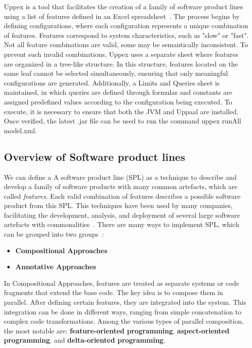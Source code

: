 Uppex is a tool that facilitates the creation of a family of software product lines using a list of features defined in an Excel spreadsheet~\cite{uppex}. The process begins by defining configurations, where each configuration represents a unique combination of features. Features correspond to system characteristics, such as "slow" or "fast". Not all feature combinations are valid, some may be semantically inconsistent. To prevent such invalid combinations, Uppex uses a separate sheet where features are organized in a tree-like structure. In this structure, features located on the same leaf cannot be selected simultaneously, ensuring that only meaningful configurations are generated. Additionally, a Limits and Queries sheet is maintained, in which queries are defined through formulas and constants are assigned predefined values according to the configuration being executed. To execute, it is necessary to ensure that both the JVM and Uppaal are installed. Once verified, the latest .jar file can be used to run the command uppex runAll model.xml.

\subsection*{Overview of Software product lines}

We can define a
A software product line (SPL) %
as a technique to describe and develop a family of software products with many common artefacts, which are called \emph{features}. 
Each valid combination of features describes a possible software product from this SPL.
This techniques have been used by many companies, facilitating the development, analysis, and deployment of several large software artefacts with commonalities~\cite{Pohl2018}.
%
There are many ways to implement SPL, which can be grouped %
into two groups~\cite{Pohl2018}:

\begin{itemize}
    \item \textbf{Compositional Approaches}
    \item \textbf{Annotative Approaches}
\end{itemize}

In Compositional Approaches, features are treated as separate systems or code fragments that extend the base code. The key idea is to compose them in parallel. After defining certain features, they are integrated into the system. This integration can be done in different ways, ranging from simple concatenation to complex code transformations. Among the various types of parallel composition, the most notable are: \textbf{feature-oriented programming}, \textbf{aspect-oriented programming}, and \textbf{delta-oriented programming}.


